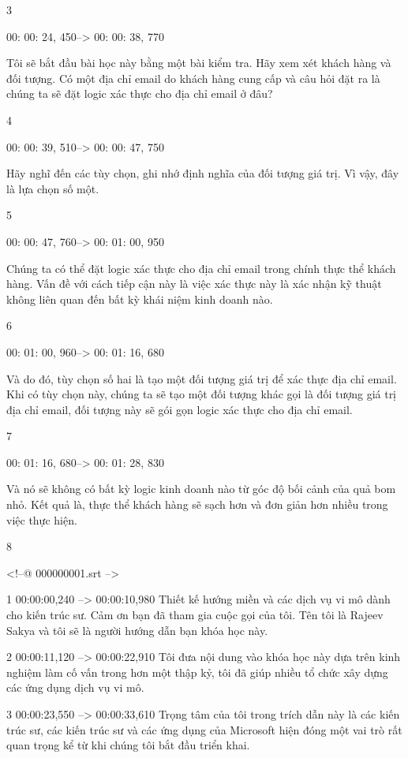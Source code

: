3

00: 00: 24, 450--> 00: 00: 38, 770

Tôi sẽ bắt đầu bài học này bằng một bài kiểm tra. Hãy xem xét khách hàng và đối tượng. Có một địa chỉ email do khách hàng cung cấp và câu hỏi đặt ra là chúng ta sẽ đặt logic xác thực cho địa chỉ email ở đâu?

4

00: 00: 39, 510--> 00: 00: 47, 750

Hãy nghĩ đến các tùy chọn, ghi nhớ định nghĩa của đối tượng giá trị. Vì vậy, đây là lựa chọn số một.

5

00: 00: 47, 760--> 00: 01: 00, 950

Chúng ta có thể đặt logic xác thực cho địa chỉ email trong chính thực thể khách hàng. Vấn đề với cách tiếp cận này là việc xác thực này là xác nhận kỹ thuật không liên quan đến bất kỳ khái niệm kinh doanh nào.

6

00: 01: 00, 960--> 00: 01: 16, 680

Và do đó, tùy chọn số hai là tạo một đối tượng giá trị để xác thực địa chỉ email. Khi có tùy chọn này, chúng ta sẽ tạo một đối tượng khác gọi là đối tượng giá trị địa chỉ email, đối tượng này sẽ gói gọn logic xác thực cho địa chỉ email.

7

00: 01: 16, 680--> 00: 01: 28, 830

Và nó sẽ không có bất kỳ logic kinh doanh nào từ góc độ bối cảnh của quả bom nhỏ. Kết quả là, thực thể khách hàng sẽ sạch hơn và đơn giản hơn nhiều trong việc thực hiện.

8






<!--@ 000000001.srt -->


1
00:00:00,240 --> 00:00:10,980
Thiết kế hướng miền và các dịch vụ vi mô dành cho kiến ​​trúc sư.  Cảm ơn bạn đã tham gia cuộc gọi của tôi.  Tên tôi là Rajeev Sakya và tôi sẽ là người hướng dẫn bạn khóa học này.

2
00:00:11,120 --> 00:00:22,910
Tôi đưa nội dung vào khóa học này dựa trên kinh nghiệm làm cố vấn trong hơn một thập kỷ, tôi đã giúp nhiều tổ chức xây dựng các ứng dụng dịch vụ vi mô.

3
00:00:23,550 --> 00:00:33,610
Trọng tâm của tôi trong trích dẫn này là các kiến ​​trúc sư, các kiến ​​trúc sư và các ứng dụng của Microsoft hiện đóng một vai trò rất quan trọng kể từ khi chúng tôi bắt đầu triển khai.

